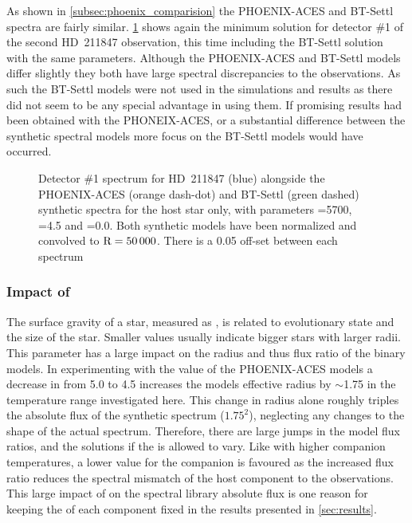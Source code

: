 As shown in \cref{subsec:phoenix_comparision} the {PHOENIX-ACES} and {BT-Settl} spectra are fairly similar.
\cref{fig:hd211847-models} shows again the minimum \textchisquared{} solution for detector \#1 of the second {HD~211847} observation, this time including the {BT-Settl} solution with the same parameters.
Although the {PHOENIX-ACES} and {BT-Settl} models differ slightly they both have large spectral discrepancies to the observations.
As such the {BT-Settl} models were not used in the \textchisqaured{} simulations and results as there did not seem to be any special advantage in using them.
If promising results had been obtained with the {PHONEIX-ACES}, or a substantial difference between the synthetic spectral models more focus on the {BT-Settl} models would have occurred. 


\begin{figure}
    \centering
    \caption{Detector \#1 spectrum for {HD~211847} (blue) alongside the {PHOENIX-ACES} (orange dash-dot) and {BT-Settl} (green dashed) synthetic spectra for the host star only, with parameters \Teff{}=5700\K{}, \logg{}=4.5 and \feh{}=0.0.
        Both synthetic models have been normalized and convolved to \(\rm R=50\,000\).
        There is a 0.05 off-set between each spectrum}
    \label{fig:hd211847-models}
\end{figure}


\subsubsection{Impact of \logg{}}
\label{subsubsec:logg} 
The surface gravity of a star, measured as \logg{}, is related to evolutionary state and the size of the star.
Smaller \logg{} values usually indicate bigger stars with larger radii.
This parameter has a large impact on the radius and thus flux ratio of the binary models.
In experimenting with the \logg{} value of the {PHOENIX-ACES} models a decrease in \logg{} from 5.0 to 4.5 increases the models effective radius by \(\sim\)1.75 in the temperature range investigated here.
This change in radius alone roughly triples the absolute flux of the synthetic spectrum (\(1.75^2\)), neglecting any changes to the shape of the actual spectrum.
Therefore, there are large jumps in the model flux ratios, and the \textchisquared{} solutions if the \logg{} is allowed to vary. Like with higher companion temperatures, a lower \logg{} value for the companion is favoured as the increased flux ratio reduces the spectral mismatch of the host component to the observations.
This large impact of \logg{} on the spectral library absolute flux is one reason for keeping the \logg{} of each component fixed in the \textchisquared{} results presented in \cref{sec:results}.

